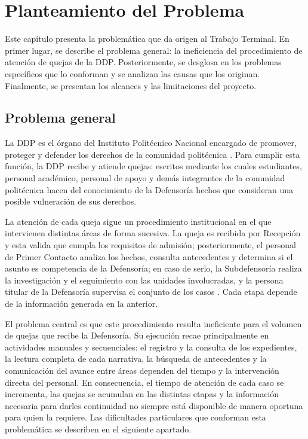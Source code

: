 	\chapter{Planteamiento del Problema}
	Este capítulo presenta la problemática que da origen al Trabajo Terminal. En primer lugar, se describe el problema general: la ineficiencia del procedimiento de atención de quejas de la DDP. Posteriormente, se desglosa en los problemas específicos que lo conforman y se analizan las causas que los originan. Finalmente, se presentan los alcances y las limitaciones del proyecto.

	\section{Problema general}
	La DDP es el órgano del Instituto Politécnico Nacional encargado de promover, proteger y defender los derechos de la comunidad politécnica \cite{ipn_acuerdo622, ipn_manual_organizacion_ddp}. Para cumplir esta función, la DDP recibe y atiende quejas: escritos mediante los cuales estudiantes, personal académico, personal de apoyo y demás integrantes de la comunidad politécnica hacen del conocimiento de la Defensoría hechos que consideran una posible vulneración de sus derechos.

	La atención de cada queja sigue un procedimiento institucional en el que intervienen distintas áreas de forma sucesiva. La queja es recibida por Recepción y esta valida que cumpla los requisitos de admisión; posteriormente, el personal de Primer Contacto analiza los hechos, consulta antecedentes y determina si el asunto es competencia de la Defensoría; en caso de serlo, la Subdefensoría realiza la investigación y el seguimiento con las unidades involucradas, y la persona titular de la Defensoría supervisa el conjunto de los casos \cite{ipn_manual_procedimientos_ddp}. Cada etapa depende de la información generada en la anterior.

	El problema central es que este procedimiento resulta ineficiente para el volumen de quejas que recibe la Defensoría. Su ejecución recae principalmente en actividades manuales y secuenciales: el registro y la consulta de los expedientes, la lectura completa de cada narrativa, la búsqueda de antecedentes y la comunicación del avance entre áreas dependen del tiempo y la intervención directa del personal. En consecuencia, el tiempo de atención de cada caso se incrementa, las quejas se acumulan en las distintas etapas y la información necesaria para darles continuidad no siempre está disponible de manera oportuna para quien la requiere. Las dificultades particulares que conforman esta problemática se describen en el siguiente apartado.

